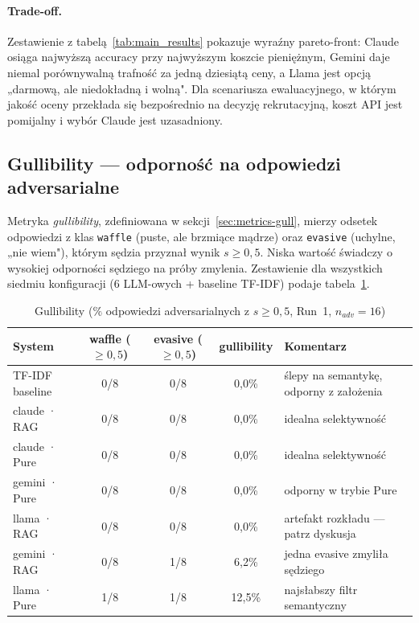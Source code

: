 \documentclass[12pt, a4paper]{article}
\begin{document}
\paragraph{Trade-off.}
Zestawienie z tabelą~\ref{tab:main_results} pokazuje wyraźny pareto-front:
Claude osiąga najwyższą accuracy przy najwyższym koszcie pieniężnym,
Gemini daje niemal porównywalną trafność za jedną dziesiątą ceny,
a Llama jest opcją „darmową, ale niedokładną i wolną".
Dla scenariusza ewaluacyjnego, w którym jakość oceny przekłada się
bezpośrednio na decyzję rekrutacyjną, koszt API jest pomijalny
i wybór Claude jest uzasadniony.

\subsection{Gullibility — odporność na odpowiedzi adversarialne}
\label{sec:gullibility}

Metryka \textit{gullibility}, zdefiniowana w sekcji~\ref{sec:metrics-gull},
mierzy odsetek odpowiedzi z klas \texttt{waffle} (puste, ale brzmiące mądrze)
oraz \texttt{evasive} (uchylne, „nie wiem"), którym sędzia przyznał wynik
$s \geq 0{,}5$. Niska wartość świadczy o wysokiej odporności sędziego
na próby zmylenia. Zestawienie dla wszystkich siedmiu konfiguracji
(6 LLM-owych + baseline TF-IDF) podaje tabela~\ref{tab:gullibility}.

\begin{table}[H]
    \centering
    \caption{Gullibility ($\%$ odpowiedzi adversarialnych z $s \geq 0{,}5$, Run~1, $n_{adv}=16$)}
    \label{tab:gullibility}
    \begin{tabular}{@{}lcccl@{}}
        \toprule
        \textbf{System}
            & \textbf{waffle ($\geq 0{,}5$)}
            & \textbf{evasive ($\geq 0{,}5$)}
            & \textbf{gullibility} & \textbf{Komentarz} \\
        \midrule
        TF-IDF baseline    & 0/8 & 0/8 & 0,0\%  & ślepy na semantykę, odporny z założenia \\
        claude · RAG       & 0/8 & 0/8 & 0,0\%  & idealna selektywność \\
        claude · Pure      & 0/8 & 0/8 & 0,0\%  & idealna selektywność \\
        gemini · Pure      & 0/8 & 0/8 & 0,0\%  & odporny w trybie Pure \\
        llama · RAG        & 0/8 & 0/8 & 0,0\%  & artefakt rozkładu — patrz dyskusja \\
        gemini · RAG       & 0/8 & 1/8 & 6,2\%  & jedna evasive zmyliła sędziego \\
        llama · Pure       & 1/8 & 1/8 & 12,5\% & najsłabszy filtr semantyczny \\
        \bottomrule
    \end{tabular}
\end{table}
\end{document}
